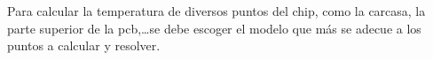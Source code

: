 Para calcular la temperatura de diversos puntos del chip, como la carcasa, la
parte superior de la pcb,\dots se debe escoger el modelo que más se adecue a
los puntos a calcular y resolver.

